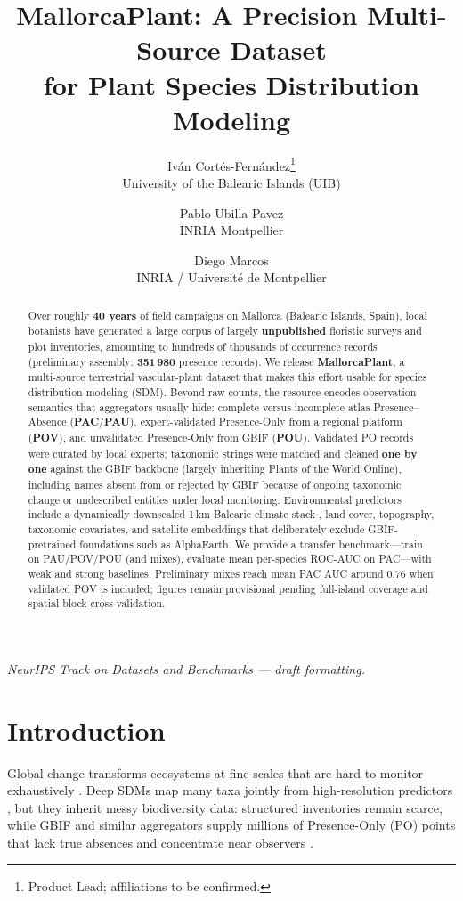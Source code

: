 \documentclass[11pt,letterpaper]{article}
\title{MallorcaPlant: A Precision Multi-Source Dataset\\for Plant Species Distribution Modeling}
\author{%
  Iv\'an Cort\'es-Fern\'andez\thanks{Product Lead; affiliations to be confirmed.}\\
  University of the Balearic Islands (UIB)
  \and
  Pablo Ubilla Pavez\\
  INRIA Montpellier
  \and
  Diego Marcos\\
  INRIA / Universit\'e de Montpellier
}
\date{}
\begin{document}
\maketitle

\begin{abstract}
Over roughly \textbf{40 years} of field campaigns on Mallorca (Balearic Islands, Spain), local botanists have generated a large corpus of largely \textbf{unpublished} floristic surveys and plot inventories, amounting to hundreds of thousands of occurrence records (preliminary assembly: \textbf{351\,980} presence records).
We release \textbf{MallorcaPlant}, a multi-source terrestrial vascular-plant dataset that makes this effort usable for species distribution modeling (SDM).
Beyond raw counts, the resource encodes observation semantics that aggregators usually hide: complete versus incomplete atlas Presence--Absence (\textbf{PAC}/\textbf{PAU}), expert-validated Presence-Only from a regional platform (\textbf{POV}), and unvalidated Presence-Only from GBIF (\textbf{POU}).
Validated PO records were curated by local experts; taxonomic strings were matched and cleaned \textbf{one by one} against the GBIF backbone (largely inheriting Plants of the World Online), including names absent from or rejected by GBIF because of ongoing taxonomic change or undescribed entities under local monitoring.
Environmental predictors include a dynamically downscaled 1\,km Balearic climate stack \citep{bahuet2026}, land cover, topography, taxonomic covariates, and satellite embeddings that deliberately exclude GBIF-pretrained foundations such as AlphaEarth.
We provide a transfer benchmark---train on PAU/POV/POU (and mixes), evaluate mean per-species ROC-AUC on PAC---with weak and strong baselines.
Preliminary mixes reach mean PAC AUC around $0.76$ when validated POV is included; figures remain provisional pending full-island coverage and spatial block cross-validation.
\end{abstract}

\noindent\textit{NeurIPS Track on Datasets and Benchmarks --- draft formatting.}


\section{Introduction}
\label{sec:intro}

Global change transforms ecosystems at fine scales that are hard to monitor exhaustively \citep{geoplant2024}.
Deep SDMs map many taxa jointly from high-resolution predictors \citep{geoplant2024}, but they inherit messy biodiversity data: structured inventories remain scarce, while GBIF and similar aggregators supply millions of Presence-Only (PO) points that lack true absences and concentrate near observers \citep{insects16080769,phillips2009sample}.
\end{document}
